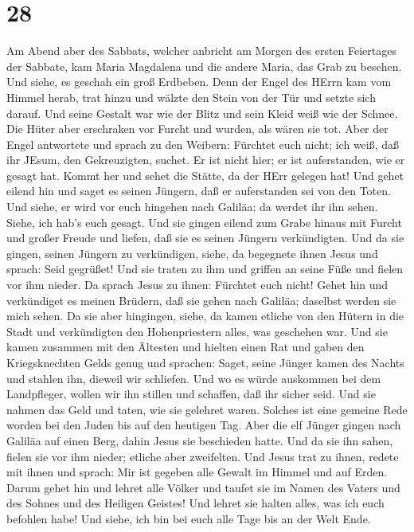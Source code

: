 \hypertarget{section-27}{%
\section{28}\label{section-27}}

 Am Abend aber des Sabbats, welcher anbricht am Morgen des
ersten Feiertages der Sabbate, kam Maria Magdalena und die andere Maria,
das Grab zu besehen.  Und siehe, es geschah ein groß
Erdbeben. Denn der Engel des HErrn kam vom Himmel herab, trat hinzu und
wälzte den Stein von der Tür und setzte sich darauf.  Und
seine Gestalt war wie der Blitz und sein Kleid weiß wie der Schnee.
 Die Hüter aber erschraken vor Furcht und wurden, als wären
sie tot.  Aber der Engel antwortete und sprach zu den
Weibern: Fürchtet euch nicht; ich weiß, daß ihr JEsum, den Gekreuzigten,
suchet.  Er ist nicht hier; er ist auferstanden, wie er
gesagt hat. Kommt her und sehet die Stätte, da der HErr gelegen hat!
 Und gehet eilend hin und saget es seinen Jüngern, daß er
auferstanden sei von den Toten. Und siehe, er wird vor euch hingehen
nach Galiläa; da werdet ihr ihn sehen. Siehe, ich hab's euch gesagt.
 Und sie gingen eilend zum Grabe hinaus mit Furcht und
großer Freude und liefen, daß sie es seinen Jüngern verkündigten. Und da
sie gingen, seinen Jüngern zu verkündigen,  siehe, da
begegnete ihnen Jesus und sprach: Seid gegrüßet! Und sie traten zu ihm
und griffen an seine Füße und fielen vor ihm nieder.  Da
sprach Jesus zu ihnen: Fürchtet euch nicht! Gehet hin und verkündiget es
meinen Brüdern, daß sie gehen nach Galiläa; daselbst werden sie mich
sehen.  Da sie aber hingingen, siehe, da kamen etliche von
den Hütern in die Stadt und verkündigten den Hohenpriestern alles, was
geschehen war.  Und sie kamen zusammen mit den Ältesten und
hielten einen Rat und gaben den Kriegsknechten Gelds genug 
und sprachen: Saget, seine Jünger kamen des Nachts und stahlen ihn,
dieweil wir schliefen.  Und wo es würde auskommen bei dem
Landpfleger, wollen wir ihn stillen und schaffen, daß ihr sicher seid.
 Und sie nahmen das Geld und taten, wie sie gelehret waren.
Solches ist eine gemeine Rede worden bei den Juden bis auf den heutigen
Tag.  Aber die elf Jünger gingen nach Galiläa auf einen
Berg, dahin Jesus sie beschieden hatte.  Und da sie ihn
sahen, fielen sie vor ihm nieder; etliche aber zweifelten. 
Und Jesus trat zu ihnen, redete mit ihnen und sprach: Mir ist gegeben
alle Gewalt im Himmel und auf Erden.  Darum gehet hin und
lehret alle Völker und taufet sie im Namen des Vaters und des Sohnes und
des Heiligen Geistes!  Und lehret sie halten alles, was ich
euch befohlen habe! Und siehe, ich bin bei euch alle Tage bis an der
Welt Ende.
